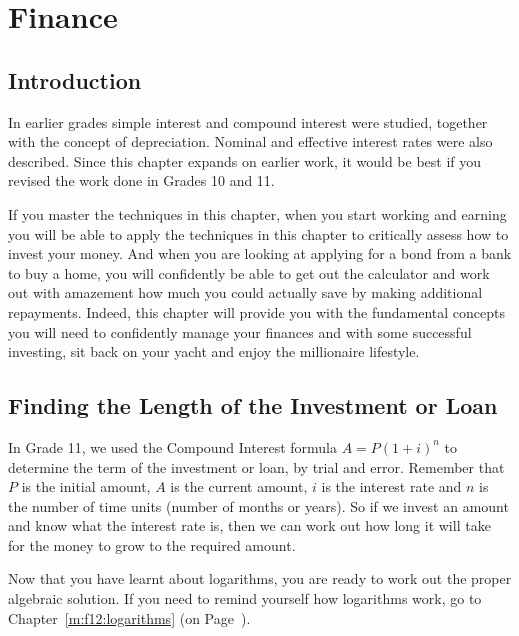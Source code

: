 \chapter{Finance}
\label{m:f12}

\section{Introduction}
In earlier grades simple interest and compound interest were studied, together with the concept of depreciation. Nominal and effective interest rates were also described. Since this chapter expands on earlier work, it would be best if you revised the work done in Grades 10 and 11.%

If you master the techniques in this chapter, when you start working and earning you will be able to apply the techniques in this chapter to critically assess how to invest your money. And when you are looking at applying for a bond from a bank to buy a home, you will confidently be able to get out the calculator and work out with amazement how much you could actually save by making additional repayments. Indeed, this chapter will provide you with the fundamental concepts you will need to confidently manage your finances and with some successful investing, sit back on your yacht and enjoy the millionaire lifestyle.


\section{Finding the Length of the Investment or Loan}
\label{sec:m:f12:term}


In Grade 11, we used the Compound Interest formula $A = P(1 + i)^n$ to determine the term of the investment or loan, by trial and error. Remember that $P$ is the initial amount, $A$ is the current amount, $i$ is the interest rate and $n$ is the number of time units (number of months or years). So if we invest an amount and know what the interest rate is, then we can work out how long it will take for the money to grow to the required amount.

Now that you have learnt about logarithms, you are ready to work out the proper algebraic solution. If you need to remind yourself how logarithms work, go to Chapter~\ref{m:f12:logarithms} (on Page~\pageref{m:f12:logarithms}).


